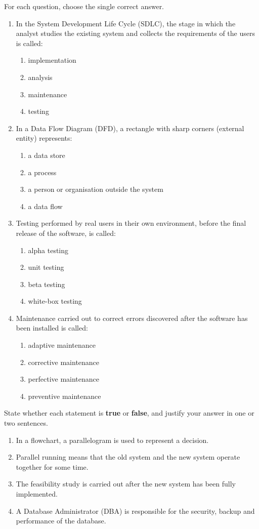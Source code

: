\documentclass[11pt]{article}
\begin{document}
\begin{exercice}
For each question, choose the single correct answer.
\begin{enumerate}
\item In the System Development Life Cycle (SDLC), the stage in which the analyst studies the existing system and collects the requirements of the users is called:
\begin{enumerate}
\item implementation \item analysis \item maintenance \item testing
\end{enumerate}
\item In a Data Flow Diagram (DFD), a rectangle with sharp corners (external entity) represents:
\begin{enumerate}
\item a data store \item a process \item a person or organisation outside the system \item a data flow
\end{enumerate}
\item Testing performed by real users in their own environment, before the final release of the software, is called:
\begin{enumerate}
\item alpha testing \item unit testing \item beta testing \item white-box testing
\end{enumerate}
\item Maintenance carried out to correct errors discovered after the software has been installed is called:
\begin{enumerate}
\item adaptive maintenance \item corrective maintenance \item perfective maintenance \item preventive maintenance
\end{enumerate}
\end{enumerate}
\end{exercice}

\begin{exercice}
State whether each statement is \textbf{true} or \textbf{false}, and justify your answer in one or two sentences.
\begin{enumerate}
\item In a flowchart, a parallelogram is used to represent a decision.
\item Parallel running means that the old system and the new system operate together for some time.
\item The feasibility study is carried out after the new system has been fully implemented.
\item A Database Administrator (DBA) is responsible for the security, backup and performance of the database.
\end{enumerate}
\end{exercice}
\end{document}
